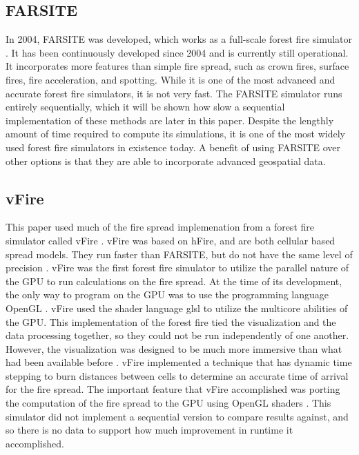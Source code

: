 \subsection{FARSITE}
In 2004, FARSITE was developed, which works as a full-scale forest fire simulator \cite{FARSITE}. It has been continuously developed since 2004 and is currently still operational. It incorporates more features than simple fire spread, such as crown fires, surface fires, fire acceleration, and spotting. While it is one of the most advanced and accurate forest fire simulators, it is not very fast. The FARSITE simulator runs entirely sequentially, which it will be shown how slow a sequential implementation of these methods are later in this paper. Despite the lengthly amount of time required to compute its simulations, it is one of the most widely used forest fire simulators in existence today. A benefit of using FARSITE over other options is that they are able to incorporate advanced geospatial data.

\subsection{vFire}
This paper used much of the fire spread implemenation from a forest fire simulator called vFire \cite{rogerthesis, vFire, rogerconf}. vFire was based on hFire, and are both cellular based spread models. They run faster than FARSITE, but do not have the same level of precision \cite{hFire}. vFire was the first forest fire simulator to utilize the parallel nature of the GPU to run calculations on the fire spread. At the time of its development, the only way to program on the GPU was to use the programming language OpenGL \cite{opengl}. vFire used the shader language glsl to utilize the multicore abilities of the GPU. This implementation of the forest fire tied the visualization and the data processing together, so they could not be run independently of one another. However, the visualization was designed to be much more immersive than what had been available before \cite{rogerconf_data}. vFire implemented a technique that has dynamic time stepping to burn distances between cells to determine an accurate time of arrival for the fire spread. The important feature that vFire accomplished was porting the computation of the fire spread to the GPU using OpenGL shaders \cite{opengl}. This simulator did not implement a sequential version to compare results against, and so there is no data to support how much improvement in runtime it accomplished. 

